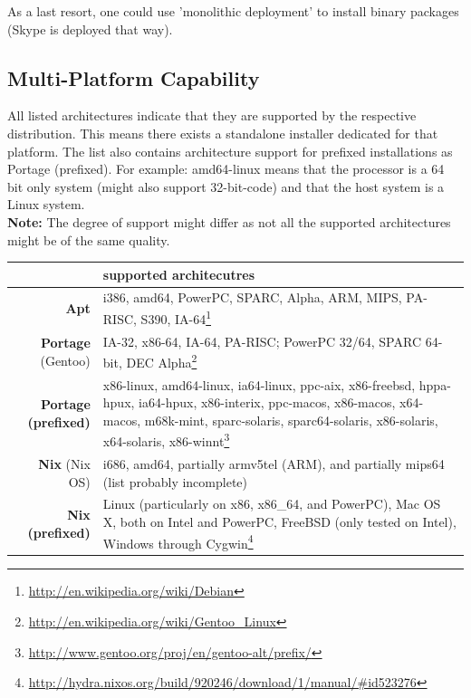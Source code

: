 \documentclass[a4paper,10pt]{article}
\begin{document}

As a last resort, one could use 'monolithic deployment' to install binary packages (Skype is deployed that way).






\subsection{Multi-Platform Capability}
All listed architectures indicate that they are supported by the respective distribution. This means there exists a standalone installer dedicated for that platform. The list also contains architecture support for prefixed installations as Portage (prefixed). For example: amd64-linux means that the processor is a 64 bit only system (might also support 32-bit-code) and that the host system is a Linux system.\\

\textbf{Note:} The degree of support might differ as not all the supported architectures might be of the same quality. \\

\begin{tabular}{ r || p{12cm} }
                     & supported architecutres \\
\hline 
  \textbf{Apt}                  &  i386, amd64, PowerPC, SPARC, Alpha, ARM, MIPS, PA-RISC, S390, IA-64\footnote{\url{http://en.wikipedia.org/wiki/Debian}} \\
  \textbf{Portage} (Gentoo)     &  IA-32, x86-64, IA-64, PA-RISC; PowerPC 32/64, SPARC 64-bit, DEC Alpha\footnote{\url{http://en.wikipedia.org/wiki/Gentoo_Linux}}\\
  \textbf{Portage (prefixed)}   &  x86-linux, amd64-linux, ia64-linux, ppc-aix, x86-freebsd, hppa-hpux, ia64-hpux, x86-interix, ppc-macos, x86-macos, x64-macos, m68k-mint, sparc-solaris, sparc64-solaris, x86-solaris, x64-solaris, x86-winnt\footnote{\url{http://www.gentoo.org/proj/en/gentoo-alt/prefix/}}\\
  \textbf{Nix} (Nix OS)         &  i686, amd64, partially armv5tel (ARM), and partially mips64 (list probably incomplete)\\
  \textbf{Nix (prefixed)}       &  Linux (particularly on x86, x86\_64, and PowerPC), Mac OS X, both on Intel and PowerPC, FreeBSD (only tested on Intel), Windows through Cygwin\footnote{\url{http://hydra.nixos.org/build/920246/download/1/manual/\#id523276}}\\
\end{tabular}
\end{document}
